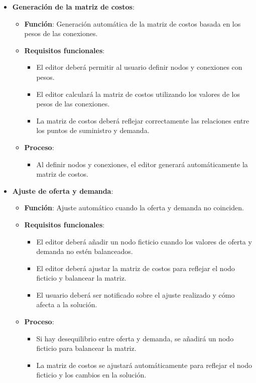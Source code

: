 \documentclass[stu, 12pt, letterpaper, donotrepeattitle, floatsintext, natbib]{apa7}
\begin{document}
\begin{itemize}
    \item \textbf{Generación de la matriz de costos}:
    \begin{itemize}
        \item \textbf{Función}: Generación automática de la matriz de costos basada en los pesos de las conexiones.
        \item \textbf{Requisitos funcionales}:
            \begin{itemize}
                \item El editor deberá permitir al usuario definir nodos y conexiones con pesos.
                \item El editor calculará la matriz de costos utilizando los valores de los pesos de las conexiones.
                \item La matriz de costos deberá reflejar correctamente las relaciones entre los puntos de suministro y demanda.
            \end{itemize}
        \item \textbf{Proceso}:
            \begin{itemize}
                \item Al definir nodos y conexiones, el editor generará automáticamente la matriz de costos.
            \end{itemize}
    \end{itemize}

    \item \textbf{Ajuste de oferta y demanda}:
    \begin{itemize}
        \item \textbf{Función}: Ajuste automático cuando la oferta y demanda no coinciden.
        \item \textbf{Requisitos funcionales}:
            \begin{itemize}
                \item El editor deberá añadir un nodo ficticio cuando los valores de oferta y demanda no estén balanceados.
                \item El editor deberá ajustar la matriz de costos para reflejar el nodo ficticio y balancear la matriz.
                \item El usuario deberá ser notificado sobre el ajuste realizado y cómo afecta a la solución.
            \end{itemize}
        \item \textbf{Proceso}:
            \begin{itemize}
                \item Si hay desequilibrio entre oferta y demanda, se añadirá un nodo ficticio para balancear la matriz.
                \item La matriz de costos se ajustará automáticamente para reflejar el nodo ficticio y los cambios en la solución.
            \end{itemize}
    \end{itemize}
    

\end{itemize}
\end{document}
